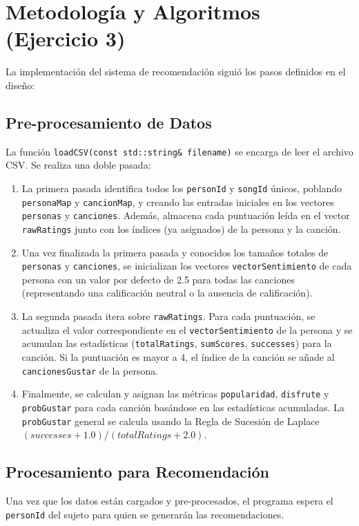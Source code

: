 \documentclass{article}
\begin{document}
\section{Metodología y Algoritmos (Ejercicio 3)}

La implementación del sistema de recomendación siguió los pasos definidos en el diseño:

\subsection{Pre-procesamiento de Datos}
La función \texttt{loadCSV(const std::string\& filename)} se encarga de leer el archivo CSV. Se realiza una doble pasada:
\begin{enumerate}[label=\arabic*.]
    \item La primera pasada identifica todos los \texttt{personId} y \texttt{songId} únicos, poblando \texttt{personaMap} y \texttt{cancionMap}, y creando las entradas iniciales en los vectores \texttt{personas} y \texttt{canciones}. Además, almacena cada puntuación leída en el vector \texttt{rawRatings} junto con los índices (ya asignados) de la persona y la canción.
    \item Una vez finalizada la primera pasada y conocidos los tamaños totales de \texttt{personas} y \texttt{canciones}, se inicializan los vectores \texttt{vectorSentimiento} de cada persona con un valor por defecto de 2.5 para todas las canciones (representando una calificación neutral o la ausencia de calificación).
    \item La segunda pasada itera sobre \texttt{rawRatings}. Para cada puntuación, se actualiza el valor correspondiente en el \texttt{vectorSentimiento} de la persona y se acumulan las estadísticas (\texttt{totalRatings}, \texttt{sumScores}, \texttt{successes}) para la canción. Si la puntuación es mayor a 4, el índice de la canción se añade al \texttt{cancionesGustar} de la persona.
    \item Finalmente, se calculan y asignan las métricas \texttt{popularidad}, \texttt{disfrute} y \texttt{probGustar} para cada canción basándose en las estadísticas acumuladas. La \texttt{probGustar} general se calcula usando la Regla de Sucesión de Laplace \((successes + 1.0) / (totalRatings + 2.0)\).
\end{enumerate}

\subsection{Procesamiento para Recomendación}
Una vez que los datos están cargados y pre-procesados, el programa espera el \texttt{personId} del sujeto para quien se generarán las recomendaciones.
\end{document}
